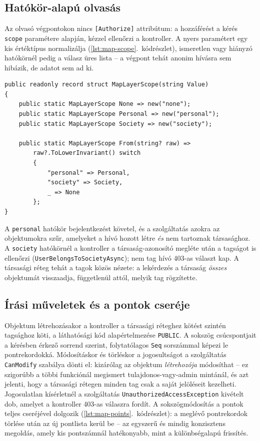 \subsection{Hatókör-alapú olvasás}

Az olvasó végpontokon nincs \texttt{[Authorize]} attribútum: a hozzáférést a kérés
\texttt{scope} paramétere alapján, kézzel ellenőrzi a kontroller. A nyers paramétert egy kis
értéktípus normalizálja (\ref{lst:map-scope}.~kódrészlet), ismeretlen vagy hiányzó hatókörnél
pedig a válasz üres lista -- a végpont tehát anonim hívásra sem hibázik, de adatot sem ad ki.

\begin{lstlisting}[language={[Sharp]C}, caption={A hatókör-paraméter normalizálása (\texttt{MapLayerScope})}, label={lst:map-scope}]
public readonly record struct MapLayerScope(string Value)
{
    public static MapLayerScope None => new("none");
    public static MapLayerScope Personal => new("personal");
    public static MapLayerScope Society => new("society");

    public static MapLayerScope From(string? raw) =>
        raw?.ToLowerInvariant() switch
        {
            "personal" => Personal,
            "society" => Society,
            _ => None
        };
}
\end{lstlisting}

A \texttt{personal} hatókör bejelentkezést követel, és a szolgáltatás azokra az objektumokra
szűr, amelyeket a hívó hozott létre \emph{és} nem tartoznak társasághoz. A \texttt{society}
hatókörnél a kontroller a társaság-azonosító megléte után a tagságot is ellenőrzi
(\texttt{UserBelongsToSocietyAsync}); nem tag hívó 403-as választ kap. A társasági réteg tehát a
tagok közös nézete: a lekérdezés a társaság \emph{összes} objektumát visszaadja, függetlenül
attól, melyik tag rögzítette.

\subsection{Írási műveletek és a pontok cseréje}

Objektum létrehozásakor a kontroller a társasági réteghez kötést szintén tagsághoz köti, a
láthatósági kód alapértelmezése \texttt{PUBLIC}. A sokszög csúcspontjait a kérésben érkező
sorrend szerint, folytatólagos \texttt{Seq} sorszámmal képezi le pontrekordokká. Módosításkor és
törléskor a jogosultságot a szolgáltatás \texttt{CanModify} szabálya dönti el: kizárólag az
objektum \emph{létrehozója} módosíthat -- ez szigorúbb a többi funkciónál megismert
tulajdonos-vagy-admin mintánál, és azt jelenti, hogy a társasági rétegen minden tag csak a saját
jelöléseit kezelheti. Jogosulatlan kísérletnél a szolgáltatás \texttt{UnauthorizedAccessException}
kivételt dob, amelyet a kontroller 403-as válaszra fordít. A sokszögmódosítás a pontok teljes
cseréjével dolgozik (\ref{lst:map-points}.~kódrészlet): a meglévő pontrekordok törlése után az új
pontlista kerül be -- az egyszerű és mindig konzisztens megoldás, amely kis pontszámnál
hatékonyabb, mint a különbségalapú frissítés.

